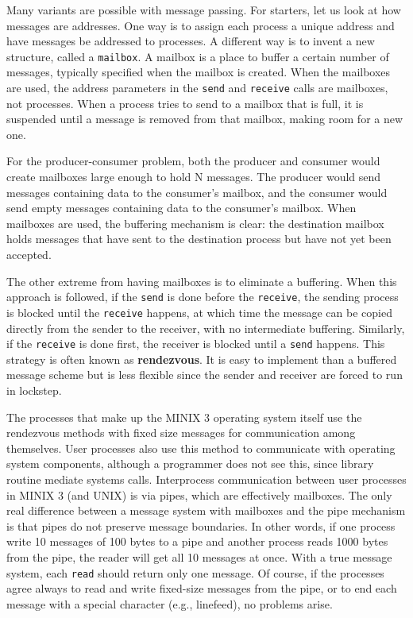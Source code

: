 \documentclass{book}
\newcommand {\kw}  [1] {\textbf{#1}}
\newcommand {\cmd} [1] {\texttt{#1}}
\begin{document}
Many variants are possible with message passing.
For starters, let us look at how messages are addresses.
One way is to assign each process a unique address and have messages be addressed to processes.
A different way is to invent a new structure, called a \cmd{mailbox}.
A mailbox is a place to buffer a certain number of messages, typically specified when the mailbox is created.
When the mailboxes are used, the address parameters in the \cmd{send} and \cmd{receive} calls are mailboxes, not processes.
When a process tries to send to a mailbox that is full, 
it is suspended until a message is removed from that mailbox, making room for a new one.

For the producer-consumer problem, both the producer and consumer would create mailboxes large enough to hold N messages.
The producer would send messages containing data to the consumer's mailbox, 
and the consumer would send empty messages containing data to the consumer's mailbox.
When mailboxes are used, the buffering mechanism is clear:
the destination mailbox holds messages that have sent to the destination process but have not yet been accepted.

The other extreme from having mailboxes is to eliminate a buffering.
When this approach is followed, 
if the \cmd{send} is done before the \cmd{receive}, the sending process is blocked until the \cmd{receive} happens,
at which time the message can be copied directly from the sender to the receiver, with no intermediate buffering.
Similarly, if the \cmd{receive} is done first, the receiver is blocked until a \cmd{send} happens.
This strategy is often known as \kw{rendezvous}.
It is easy to implement than a buffered message scheme but is less flexible since the sender and receiver are forced to run in lockstep.

The processes that make up the MINIX 3 operating system itself use the rendezvous methods 
with fixed size messages for communication among themselves.
User processes also use this method to communicate with operating system components,
although a programmer does not see this, since library routine mediate systems calls.
Interprocess communication between user processes in MINIX 3 (and UNIX) is via pipes, which are effectively mailboxes.
The only real difference between a message system with mailboxes and the pipe mechanism is that
pipes do not preserve message boundaries.
In other words, if one process write 10 messages of 100 bytes to a pipe and another process reads 1000 bytes from the pipe,
the reader will get all 10 messages at once.
With a true message system, each \cmd{read} should return only one message.
Of course, if the processes agree always to read and write fixed-size messages from the pipe, 
or to end each message with a special character (e.g., linefeed), no problems arise.
\end{document}
